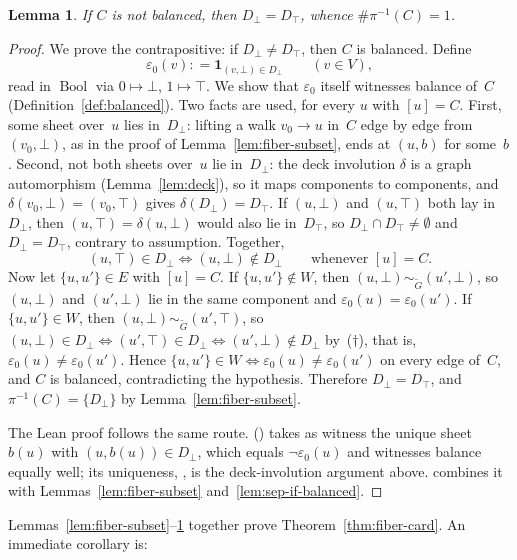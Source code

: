 \documentclass[11pt,a4paper]{amsart}
\theoremstyle{plain}
\newtheorem{lemma}[theorem]{Lemma}
\theoremstyle{definition}
\theoremstyle{remark}
\newcommand{\tG}{\widetilde{G}}
\newcommand{\defeq}{\mathrel{\mathop:}=}
\begin{document}
\begin{lemma}\label{lem:merge-if-unbalanced}
If $C$ is not balanced, then $D_\bot=D_\top$, whence
$\#\pi^{-1}(C)=1$.
\end{lemma}

\begin{proof}
We prove the contrapositive: if $D_\bot\ne D_\top$, then $C$ is
balanced. Define
\[
  \varepsilon_0(v)\defeq \mathbf{1}_{(v,\bot)\in D_\bot}
  \qquad (v\in V),
\]
read in $\operatorname{Bool}$ via $0\mapsto\bot$, $1\mapsto\top$. We
show that $\varepsilon_0$ itself witnesses balance of~$C$
(Definition~\ref{def:balanced}). Two facts are used, for every $u$
with $[u]=C$.
First, some sheet over~$u$ lies in~$D_\bot$: lifting a walk
$v_0\to u$ in~$C$ edge by edge from $(v_0,\bot)$, as in the proof of
Lemma~\ref{lem:fiber-subset}, ends at $(u,b)$ for some~$b$.
Second, not both sheets over~$u$ lie in~$D_\bot$: the deck involution
$\delta$ is a graph automorphism (Lemma~\ref{lem:deck}), so it maps
components to components, and $\delta(v_0,\bot)=(v_0,\top)$ gives
$\delta(D_\bot)=D_\top$. If $(u,\bot)$ and $(u,\top)$ both lay
in~$D_\bot$, then $(u,\top)=\delta(u,\bot)$ would also lie in~$D_\top$,
so $D_\bot\cap D_\top\ne\emptyset$ and $D_\bot=D_\top$, contrary to
assumption. Together,
\[
  (u,\top)\in D_\bot \iff (u,\bot)\notin D_\bot
  \qquad\text{whenever } [u]=C. \tag{$\dagger$}
\]
Now let $\{u,u'\}\in E$ with $[u]=C$. If $\{u,u'\}\notin W$, then
$(u,\bot)\sim_{\tG}(u',\bot)$, so $(u,\bot)$ and $(u',\bot)$ lie in the
same component and $\varepsilon_0(u)=\varepsilon_0(u')$. If
$\{u,u'\}\in W$, then $(u,\bot)\sim_{\tG}(u',\top)$, so
$(u,\bot)\in D_\bot\iff(u',\top)\in D_\bot\iff(u',\bot)\notin D_\bot$
by~($\dagger$), that is, $\varepsilon_0(u)\ne\varepsilon_0(u')$. Hence
$\{u,u'\}\in W\iff\varepsilon_0(u)\ne\varepsilon_0(u')$ on every edge
of~$C$, and $C$ is balanced, contradicting the hypothesis. Therefore
$D_\bot = D_\top$, and $\pi^{-1}(C)=\{D_\bot\}$ by
Lemma~\ref{lem:fiber-subset}.

The Lean proof follows the same route.
 ()
takes as witness the unique sheet $b(u)$ with $(u,b(u))\in D_\bot$,
which equals $\neg\varepsilon_0(u)$ and witnesses balance equally well;
its uniqueness, , is the
deck-involution argument above. 
combines it with Lemmas~\ref{lem:fiber-subset}
and~\ref{lem:sep-if-balanced}.
\end{proof}

Lemmas~\ref{lem:fiber-subset}--\ref{lem:merge-if-unbalanced} together
prove Theorem~\ref{thm:fiber-card}. An immediate corollary is:
\end{document}

